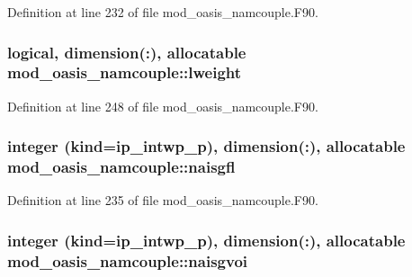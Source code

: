 Definition at line 232 of file mod\+\_\+oasis\+\_\+namcouple.\+F90.

\hypertarget{classmod__oasis__namcouple_a8d88d0c1b22ea43a9429f9e3a653a64b}{
\subsubsection[{lweight}]{\setlength{\rightskip}{0pt plus 5cm}logical, dimension(\+:), allocatable mod\+\_\+oasis\+\_\+namcouple\+::lweight\hspace{0.3cm}{\ttfamily [private]}}}\label{classmod__oasis__namcouple_a8d88d0c1b22ea43a9429f9e3a653a64b}


Definition at line 248 of file mod\+\_\+oasis\+\_\+namcouple.\+F90.

\hypertarget{classmod__oasis__namcouple_ada0ad7614eba9cc3a1e168484a520c33}{
\subsubsection[{naisgfl}]{\setlength{\rightskip}{0pt plus 5cm}integer (kind=ip\+\_\+intwp\+\_\+p), dimension(\+:), allocatable mod\+\_\+oasis\+\_\+namcouple\+::naisgfl\hspace{0.3cm}{\ttfamily [private]}}}\label{classmod__oasis__namcouple_ada0ad7614eba9cc3a1e168484a520c33}


Definition at line 235 of file mod\+\_\+oasis\+\_\+namcouple.\+F90.

\hypertarget{classmod__oasis__namcouple_a87c0bb7c0a2cccbb673dcaf35e3dec50}{
\subsubsection[{naisgvoi}]{\setlength{\rightskip}{0pt plus 5cm}integer (kind=ip\+\_\+intwp\+\_\+p), dimension(\+:), allocatable mod\+\_\+oasis\+\_\+namcouple\+::naisgvoi\hspace{0.3cm}{\ttfamily [private]}}}\label{classmod__oasis__namcouple_a87c0bb7c0a2cccbb673dcaf35e3dec50}


